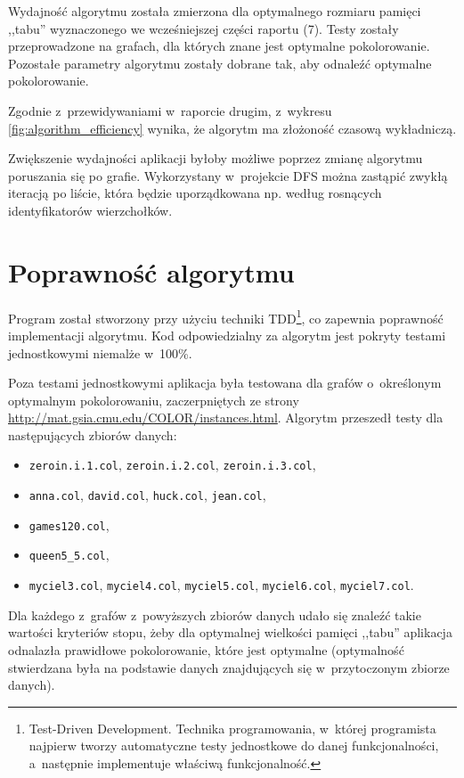 \documentclass[a4paper,10pt]{article}
\begin{document}
Wydajność algorytmu została zmierzona dla optymalnego rozmiaru pamięci ,,tabu'' wyznaczonego we wcześniejszej części raportu (7). Testy zostały przeprowadzone na grafach, dla których znane jest optymalne pokolorowanie. Pozostałe parametry algorytmu zostały dobrane tak, aby odnaleźć optymalne pokolorowanie.
    
Zgodnie z~przewidywaniami w~raporcie drugim, z~wykresu \ref{fig:algorithm_efficiency} wynika, że algorytm ma złożoność czasową wykładniczą.

Zwiększenie wydajności aplikacji byłoby możliwe poprzez zmianę algorytmu poruszania się po grafie. Wykorzystany w~projekcie DFS można zastąpić zwykłą iteracją po liście, która będzie uporządkowana np. według rosnących identyfikatorów wierzchołków.

\section*{Poprawność algorytmu}

Program został stworzony przy użyciu techniki TDD\footnote{Test-Driven Development. Technika programowania, w~której programista najpierw tworzy automatyczne testy jednostkowe do danej funkcjonalności, a~następnie implementuje właściwą funkcjonalność.}, co zapewnia poprawność implementacji algorytmu. Kod odpowiedzialny za algorytm jest pokryty testami jednostkowymi niemalże w~100\%.

Poza testami jednostkowymi aplikacja była testowana dla grafów o~określonym optymalnym pokolorowaniu, zaczerpniętych ze strony \url{http://mat.gsia.cmu.edu/COLOR/instances.html}. Algorytm przeszedł testy dla następujących zbiorów danych:

\begin{itemize}
    \item \verb+zeroin.i.1.col+, \verb+zeroin.i.2.col+, \verb+zeroin.i.3.col+,
    \item \verb+anna.col+, \verb+david.col+, \verb+huck.col+, \verb+jean.col+,
    \item \verb+games120.col+,
    \item \verb+queen5_5.col+,
    \item \verb+myciel3.col+, \verb+myciel4.col+, \verb+myciel5.col+, \verb+myciel6.col+, \verb+myciel7.col+.
\end{itemize}

Dla każdego z~grafów z~powyższych zbiorów danych udało się znaleźć takie wartości kryteriów stopu, żeby dla optymalnej wielkości pamięci ,,tabu'' aplikacja odnalazła prawidłowe pokolorowanie, które jest optymalne (optymalność stwierdzana była na podstawie danych znajdujących się w~przytoczonym zbiorze danych). 
\end{document}
